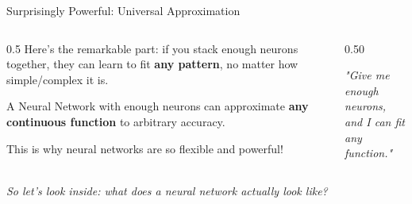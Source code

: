\begin{frame}{Surprisingly Powerful: Universal Approximation}
    \begin{columns}[c]
        \begin{column}{0.5\textwidth}
            Here's the remarkable part: if you stack enough neurons together, they can learn to fit \textbf{any pattern}, no matter how simple/complex it is.
            
            \vspace{1em}
            \begin{tcolorbox}[colback=yellow!10, colframe=orange!60, title=\textbf{Universal Approximation Theorem}]
                \small
                A Neural Network with enough neurons can approximate \textbf{any continuous function} to arbitrary accuracy.
            \end{tcolorbox}

            \vspace{0.5em}
            \small This is why neural networks are so flexible and powerful!
        \end{column}
        
        \begin{column}{0.50\textwidth}
            \centering
            
            
            \vspace{0.5em}
            \small \textit{"Give me enough neurons, \\and I can fit any function."}
        \end{column}
    \end{columns}

    \pause
    \vspace{1em}
    \centering
    \textit{So let's look inside: what does a neural network actually look like?}
\end{frame}

